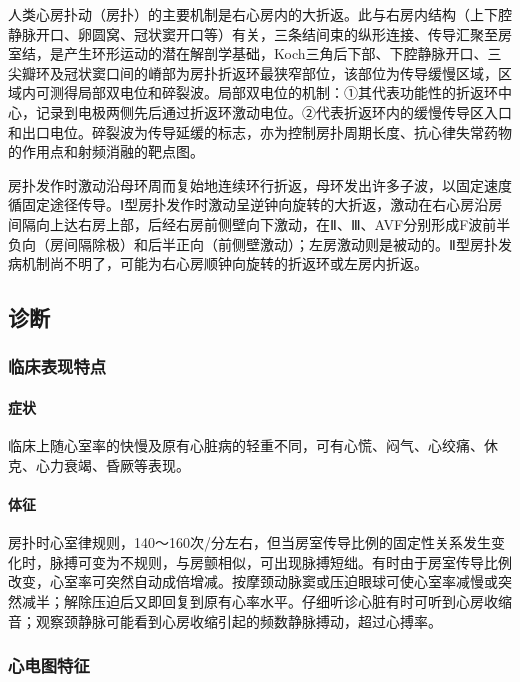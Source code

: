 人类心房扑动（房扑）的主要机制是右心房内的大折返。此与右房内结构（上下腔静脉开口、卵圆窝、冠状窦开口等）有关，三条结间束的纵形连接、传导汇聚至房室结，是产生环形运动的潜在解剖学基础，Koch三角后下部、下腔静脉开口、三尖瓣环及冠状窦口间的嵴部为房扑折返环最狭窄部位，该部位为传导缓慢区域，区域内可测得局部双电位和碎裂波。局部双电位的机制：①其代表功能性的折返环中心，记录到电极两侧先后通过折返环激动电位。②代表折返环内的缓慢传导区入口和出口电位。碎裂波为传导延缓的标志，亦为控制房扑周期长度、抗心律失常药物的作用点和射频消融的靶点图。

房扑发作时激动沿母环周而复始地连续环行折返，母环发出许多子波，以固定速度循固定途径传导。Ⅰ型房扑发作时激动呈逆钟向旋转的大折返，激动在右心房沿房间隔向上达右房上部，后经右房前侧壁向下激动，在Ⅱ、Ⅲ、AVF分别形成F波前半负向（房间隔除极）和后半正向（前侧壁激动）；左房激动则是被动的。Ⅱ型房扑发病机制尚不明了，可能为右心房顺钟向旋转的折返环或左房内折返。

\subsection{诊断}

\subsubsection{临床表现特点}

\paragraph{症状}

临床上随心室率的快慢及原有心脏病的轻重不同，可有心慌、闷气、心绞痛、休克、心力衰竭、昏厥等表现。

\paragraph{体征}

房扑时心室律规则，140～160次/分左右，但当房室传导比例的固定性关系发生变化时，脉搏可变为不规则，与房颤相似，可出现脉搏短绌。有时由于房室传导比例改变，心室率可突然自动成倍增减。按摩颈动脉窦或压迫眼球可使心室率减慢或突然减半；解除压迫后又即回复到原有心率水平。仔细听诊心脏有时可听到心房收缩音；观察颈静脉可能看到心房收缩引起的频数静脉搏动，超过心搏率。

\subsubsection{心电图特征}


